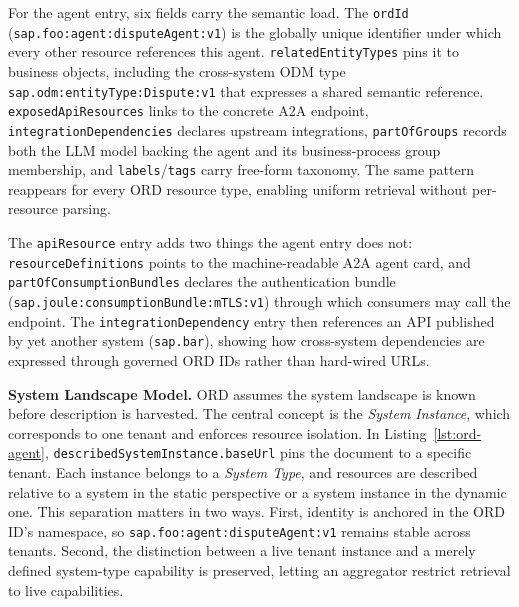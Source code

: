 For the agent entry, six fields carry the semantic load. The \texttt{ordId} (\texttt{sap.foo:agent:disputeAgent:v1}) is the globally unique identifier under which every other resource references this agent. \texttt{relatedEntityTypes} pins it to business objects, including the cross-system ODM type \texttt{sap.odm:entityType:Dispute:v1} that expresses a shared semantic reference. \texttt{exposedApiResources} links to the concrete A2A endpoint, \texttt{integrationDependencies} declares upstream integrations, \texttt{partOfGroups} records both the LLM model backing the agent and its business-process group membership, and \texttt{labels}/\texttt{tags} carry free-form taxonomy. The same pattern reappears for every ORD resource type, enabling uniform retrieval without per-resource parsing.

The \texttt{apiResource} entry adds two things the agent entry does not: \texttt{resourceDefinitions} points to the machine-readable A2A agent card, and \texttt{partOfConsumptionBundles} declares the authentication bundle (\texttt{sap.joule:consumptionBundle:mTLS:v1}) through which consumers may call the endpoint. The \texttt{integrationDependency} entry then references an API published by yet another system (\texttt{sap.bar}), showing how cross-system dependencies are expressed through governed ORD IDs rather than hard-wired URLs.

\textbf{System Landscape Model.} ORD assumes the system landscape is known before description is harvested. The central concept is the \emph{System Instance}, which corresponds to one tenant and enforces resource isolation. In Listing~\ref{lst:ord-agent}, \texttt{describedSystemInstance.baseUrl} pins the document to a specific tenant. Each instance belongs to a \emph{System Type}, and resources are described relative to a system in the static perspective or a system instance in the dynamic one. This separation matters in two ways. First, identity is anchored in the ORD ID's namespace, so \texttt{sap.foo:agent:disputeAgent:v1} remains stable across tenants. Second, the distinction between a live tenant instance and a merely defined system-type capability is preserved, letting an aggregator restrict retrieval to live capabilities.

